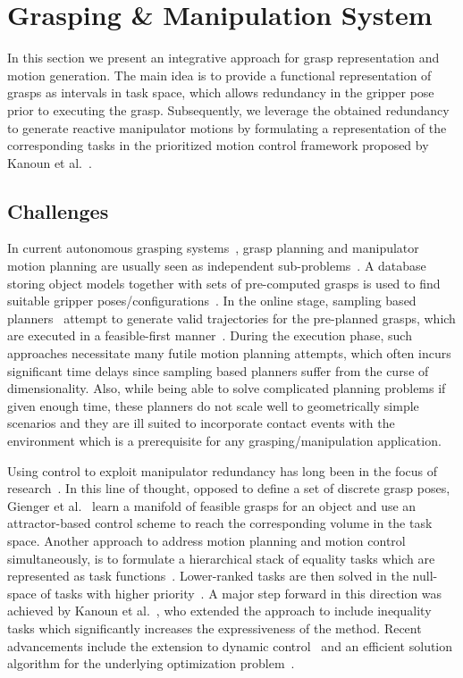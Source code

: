 \section{Grasping \& Manipulation System}
\label{sec:manip}
%
In this section we present an integrative approach for grasp representation and motion
generation. The main idea is to provide a functional representation of grasps as intervals in task
space, which allows redundancy in the gripper pose prior to executing the grasp. Subsequently, we
leverage the obtained redundancy to generate reactive manipulator motions by formulating a
representation of the corresponding tasks in the prioritized motion control framework proposed by
Kanoun et al.~\cite{Kano11}.
%
\subsection{Challenges}
\label{subsec:Challenges}
%
In current autonomous grasping systems~\cite{Bere07, Srin10, Krug14a}, grasp planning and
manipulator motion planning are usually seen as independent sub-problems~\cite{Dian10}. A database
storing object models together with sets of pre-computed grasps is used to find suitable gripper
poses/configurations~\cite{Mill04, Gold11, Krug14a}. In the online stage, sampling based
planners~\cite{LaVa06} attempt to generate valid trajectories for the pre-planned grasps, which are
executed in a feasible-first manner~\cite{Bere07}. During the execution phase, such approaches
necessitate many futile motion planning attempts, which often incurs significant time delays since
sampling based planners suffer from the curse of dimensionality. Also, while being able to solve
complicated planning problems if given enough time, these planners do not scale well to
geometrically simple scenarios and they are ill suited to incorporate contact events with the
environment which is a prerequisite for any grasping/manipulation application.

Using control to exploit manipulator redundancy has long been in the focus of research~\cite{Sici91,
  Sent10}. In this line of thought, opposed to define a set of discrete grasp poses, Gienger et
al.~\cite{Gien08a, Gien08b} learn a manifold of feasible grasps for an object and use an
attractor-based control scheme to reach the corresponding volume in the task space. Another approach
to address motion planning and motion control simultaneously, is to formulate a hierarchical stack
of equality tasks which are represented as task functions~\cite{Sams91}. Lower-ranked tasks are then
solved in the null-space of tasks with higher priority~\cite{Sici91, Sent10}. A major step forward
in this direction was achieved by Kanoun et al.~\cite{Kano11}, who extended the approach to include
inequality tasks which significantly increases the expressiveness of the method. Recent advancements
include the extension to dynamic control~\cite{Saab13} and an efficient solution algorithm for the
underlying optimization problem~\cite{Esca14}.
%
